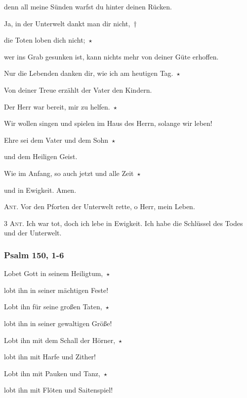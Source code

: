 denn all meine Sünden warfst du hinter deinen Rücken.

\noindent Ja, in der Unterwelt dankt man dir nicht,~†~\nopagebreak

die Toten loben dich nicht;~$\star$~\nopagebreak

wer ins Grab gesunken ist, kann nichts mehr von deiner Güte erhoffen.

\noindent Nur die Lebenden danken dir, wie ich am heutigen Tag.~$\star$~\nopagebreak

Von deiner Treue erzählt der Vater den Kindern.

\noindent Der Herr war bereit, mir zu helfen.~$\star$~\nopagebreak

Wir wollen singen und spielen im Haus des Herrn, solange wir leben!

\noindent Ehre sei dem Vater und dem Sohn~$\star$~\nopagebreak

und dem Heiligen Geist.

\noindent Wie im Anfang, so auch jetzt und alle Zeit~$\star$~\nopagebreak

und in Ewigkeit. Amen.

\vspace{10pt}

\noindent \textsc{Ant.} Vor den Pforten der Unterwelt rette, o Herr, mein Leben.


\newpage

\noindent \textsc{3 Ant.} Ich war tot, doch ich lebe in Ewigkeit. Ich habe die Schlüssel des Todes und der Unterwelt.

\subsubsection{Psalm 150, 1-6}

\noindent Lobet Gott in seinem Heiligtum,~$\star$~\nopagebreak

lobt ihn in seiner mächtigen Feste!

\noindent Lobt ihn für seine großen Taten,~$\star$~\nopagebreak

lobt ihn in seiner gewaltigen Größe!

\noindent Lobt ihn mit dem Schall der Hörner,~$\star$~\nopagebreak

lobt ihn mit Harfe und Zither!

\noindent Lobt ihn mit Pauken und Tanz,~$\star$~\nopagebreak

lobt ihn mit Flöten und Saitenspiel!

